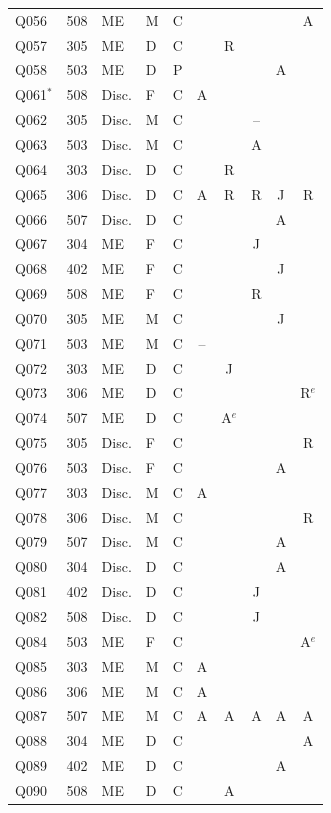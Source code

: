 {\begin{longtable}{llllcccccc}
Q056 & 508 & ME & M & C &  &  &  &  & A \\
Q057 & 305 & ME & D & C &  & R &  &  &  \\
Q058 & 503 & ME & D & P &  &  &  & A &  \\
Q061$^{*}$ & 508 & Disc. & F & C & A &  &  &  &  \\
Q062 & 305 & Disc. & M & C &  &  & -- &  &  \\
Q063 & 503 & Disc. & M & C &  &  & A &  &  \\
Q064 & 303 & Disc. & D & C &  & R &  &  &  \\
Q065 & 306 & Disc. & D & C & A & R & R & J & R \\
Q066 & 507 & Disc. & D & C &  &  &  & A &  \\
Q067 & 304 & ME & F & C &  &  & J &  &  \\
Q068 & 402 & ME & F & C &  &  &  & J &  \\
Q069 & 508 & ME & F & C &  &  & R &  &  \\
Q070 & 305 & ME & M & C &  &  &  & J &  \\
Q071 & 503 & ME & M & C & -- &  &  &  &  \\
Q072 & 303 & ME & D & C &  & J &  &  &  \\
Q073 & 306 & ME & D & C &  &  &  &  & R$^{e}$ \\
Q074 & 507 & ME & D & C &  & A$^{e}$ &  &  &  \\
Q075 & 305 & Disc. & F & C &  &  &  &  & R \\
Q076 & 503 & Disc. & F & C &  &  &  & A &  \\
Q077 & 303 & Disc. & M & C & A &  &  &  &  \\
Q078 & 306 & Disc. & M & C &  &  &  &  & R \\
Q079 & 507 & Disc. & M & C &  &  &  & A &  \\
Q080 & 304 & Disc. & D & C &  &  &  & A &  \\
Q081 & 402 & Disc. & D & C &  &  & J &  &  \\
Q082 & 508 & Disc. & D & C &  &  & J &  &  \\
Q084 & 503 & ME & F & C &  &  &  &  & A$^{e}$ \\
Q085 & 303 & ME & M & C & A &  &  &  &  \\
Q086 & 306 & ME & M & C & A &  &  &  &  \\
Q087 & 507 & ME & M & C & A & A & A & A & A \\
Q088 & 304 & ME & D & C &  &  &  &  & A \\
Q089 & 402 & ME & D & C &  &  &  & A &  \\
Q090 & 508 & ME & D & C &  & A &  &  &  \\
\end{longtable}
}
